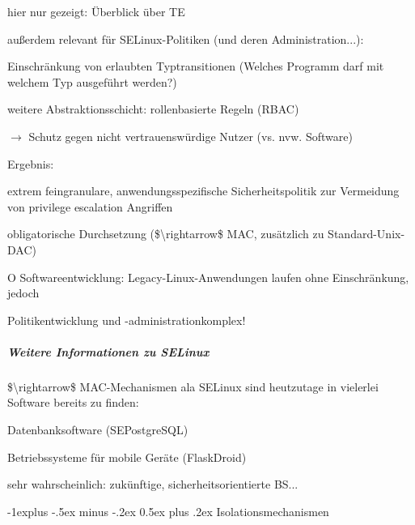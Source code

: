 \documentclass[a4paper]{article}
\makeatletter
\newcommand{\cmark}{\ding{51}}
\newcommand{\xmark}{\ding{55}}
\renewcommand{\subsection}{\@startsection{subsection}{2}{0mm}%
 {-1explus -.5ex minus -.2ex}%
 {0.5ex plus .2ex}%
 {\normalfont\normalsize\bfseries}}
\makeatother
\begin{document}
\begin{multicols}{3}
    \begin{itemize*}
        \item
        hier nur gezeigt: Überblick über TE
        \item
        außerdem relevant für SELinux-Politiken (und deren Administration...):
        \begin{itemize*}
            \item Einschränkung von erlaubten Typtransitionen (Welches Programm darf mit welchem Typ ausgeführt werden?)
            \item weitere Abstraktionsschicht: rollenbasierte Regeln (RBAC)
            \item $\rightarrow$  Schutz gegen nicht vertrauenswürdige Nutzer (vs. nvw. Software)
        \end{itemize*}
        \item
        Ergebnis:
        \begin{itemize*}
            \item \cmark  extrem feingranulare, anwendungsspezifische Sicherheitspolitik zur Vermeidung von privilege escalation Angriffen
            \item \cmark  obligatorische Durchsetzung (\$\textbackslash rightarrow\$ MAC, zusätzlich zu Standard-Unix-DAC)
            \item O Softwareentwicklung: Legacy-Linux-Anwendungen laufen ohne Einschränkung, jedoch
            \item \xmark  Politikentwicklung und -administrationkomplex!
        \end{itemize*}
    \end{itemize*}


    \subparagraph{Weitere Informationen zu
        SELinux}

    \$\textbackslash rightarrow\$ MAC-Mechanismen ala SELinux sind
    heutzutage in vielerlei Software bereits zu finden:

    \begin{itemize*}
        \item
        Datenbanksoftware (SEPostgreSQL)
        \item
        Betriebssysteme für mobile Geräte (FlaskDroid)
        \item
        sehr wahrscheinlich: zukünftige, sicherheitsorientierte BS...
    \end{itemize*}


    \subsection{Isolationsmechanismen}


\end{multicols}
\end{document}
